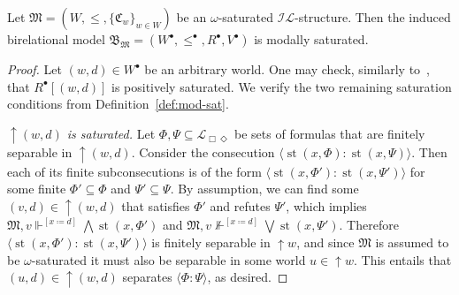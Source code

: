 \documentclass[submission,copyright,creativecommons]{eptcs}
\newcommand{\mo}{\mathfrak}
\newcommand{\B}{\mo{B}}
\DeclareMathOperator{\st}{st}
\newcommand{\IL}{\mathscr{I\!\!L}}   %
\newcommand{\ML}{\mathcal{L}_{\Box\Diamond}}        %
\newcommand{\consec}[2]{\langle #1:#2 \rangle}
\newcommand{\satisfySym}{\Vdash}
\newcommand{\satisfy}[4]{#1, #2 \satisfySym^{#4} #3}
\newcommand{\notsatisfy}[4]{#1, #2 \not\Vdash^{#4} #3}
\begin{document}
\begin{proposition}\label{prop:ind_sat}
  Let $\mo{M} = (W, \leq, \{ \mo{C}_w \}_{w \in W})$ be an
  $\omega$-saturated $\IL$-structure. Then the induced birelational model
  $\B_{\mo{M}} = (W^{\bullet}, \leq^{\bullet}, R^{\bullet}, V^{\bullet})$ is
  modally saturated.
\end{proposition}
\begin{proof}
  Let $(w, d) \in W^{\bullet}$ be an arbitrary world.
  One may check, similarly to~\cite[Theorem~2.65]{BlaRijVen01}, that $R^{\bullet}[(w, d)]$ is
  positively saturated. We verify the two remaining saturation conditions
  from Definition~\ref{def:mod-sat}.
  
  \medskip\noindent
  \textit{${\uparrow}(w,d)$ is saturated.}
    Let $\Phi, \Psi \subseteq \ML$ be sets of formulas that are finitely separable in ${\uparrow}(w,d)$. Consider the consecution $\consec{\st(x, \Phi)}{\st(x, \Psi)}$.
    Then each of its finite subconsecutions is of the form
    $\consec{\st(x, \Phi')}{\st(x, \Psi')}$ for some finite $\Phi' \subseteq \Phi$
    and $\Psi' \subseteq \Psi$.
    By assumption, we can find some $(v, d) \in {\uparrow}(w, d)$ that
    satisfies $\Phi'$ and refutes $\Psi'$, which implies
    $\satisfy{\mo{M}}{v}{\bigwedge\st(x,\Phi')}{[x \coloneq d]}$
    and $\notsatisfy{\mo{M}}{v}{\bigvee\st(x,\Psi')}{[x \coloneq d]}$.
    Therefore $\consec{\st(x, \Phi')}{\st(x, \Psi')}$ is finitely separable
    in ${\uparrow}w$, and since $\mo{M}$ is assumed to be $\omega$-saturated
    it must also be separable in some world $u \in {\uparrow}w$.
    This entails that $(u, d) \in {\uparrow}(w, d)$ separates $\consec{\Phi}{\Psi}$, as desired.


\end{proof}
\end{document}
